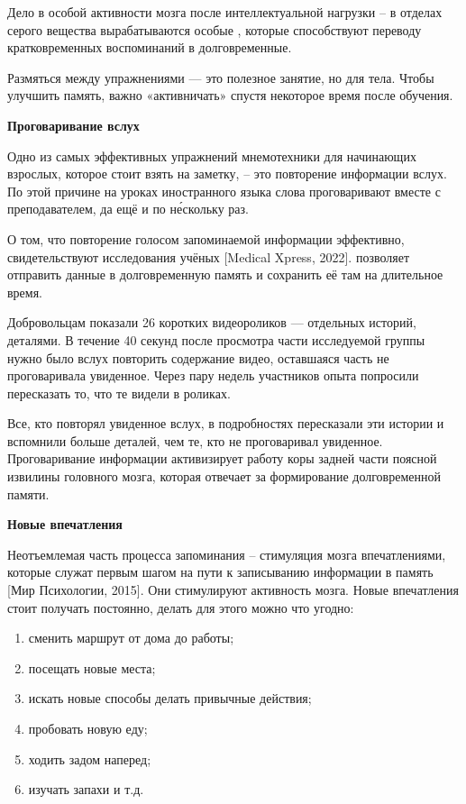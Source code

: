 Дело в особой активности мозга после интеллектуальной нагрузки – в отделах серого вещества вырабатываются особые , которые способствуют переводу кратковременных воспоминаний в долговременные.

Размяться между упражнениями --- это полезное занятие, но для тела. Чтобы улучшить память, важно «активничать» спустя некоторое время после обучения.

\textbf{Проговаривание вслух}

Одно из самых эффективных упражнений мнемотехники для начинающих взрослых, которое стоит взять на заметку, – это повторение информации вслух. По этой причине на уроках иностранного языка слова проговаривают вместе с преподавателем, да ещё и по н\'{е}скольку раз.

О том, что повторение голосом запоминаемой информации эффективно, свидетельствуют исследования учёных [Medical Xpress, 2022].  позволяет отправить данные в долговременную память и сохранить её там на длительное время.

Добровольцам показали 26 коротких видеороликов --- отдельных историй,  деталями. В течение 40 секунд после просмотра части исследуемой группы нужно было вслух повторить содержание видео, оставшаяся часть не проговаривала увиденное. Через пару недель участников опыта попросили пересказать то, что те видели в роликах.

Все, кто повторял увиденное вслух, в подробностях пересказали эти истории и вспомнили больше деталей, чем те, кто не проговаривал увиденное. Проговаривание информации активизирует работу коры задней части поясной извилины головного мозга, которая отвечает за формирование долговременной памяти.

\textbf{Новые впечатления}

Неотъемлемая часть процесса запоминания – стимуляция мозга впечатлениями, которые служат первым шагом на пути к записыванию информации в память [Мир Психологии, 2015]. Они стимулируют активность мозга. Новые впечатления стоит получать постоянно, делать для этого можно что угодно:
\begin{enumerate}
    \item сменить маршрут от дома до работы;
    \item посещать новые места;
    \item искать новые способы делать привычные действия;
    \item пробовать новую еду;
    \item ходить задом наперед;
    \item изучать запахи и т.д.
\end{enumerate}

